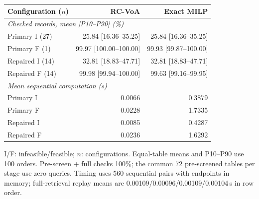 \caption{Matched interval and exact verification}\label{tab:exactverification}\centering
\footnotesize\setlength{\tabcolsep}{2pt}\renewcommand{\arraystretch}{1.0}
\begin{tabular*}{\linewidth}{@{\extracolsep{\fill}}lrr@{}}\toprule
Configuration ($n$)&RC-VoA&Exact MILP\\\midrule
\multicolumn{3}{l}{\textit{Checked records, mean [P10--P90] (\%)}}\\
Primary I (27)&25.84 [16.36--35.25]&25.84 [16.36--35.25]\\
Primary F (1)&99.97 [100.00--100.00]&99.93 [99.87--100.00]\\
Repaired I (14)&32.81 [18.83--47.71]&32.81 [18.83--47.71]\\
Repaired F (14)&99.98 [99.94--100.00]&99.63 [99.16--99.95]\\\midrule
\multicolumn{3}{l}{\textit{Mean sequential computation (s)}}\\
Primary I&0.0066&0.3879\\
Primary F&0.0228&1.7335\\
Repaired I&0.0085&0.4287\\
Repaired F&0.0236&1.6292\\\bottomrule
\end{tabular*}
\par\smallskip\parbox{\linewidth}{\footnotesize I/F: infeasible/feasible; $n$: configurations. Equal-table means and P10--P90 use 100 orders. Pre-screen + full checks 100\%; the common 72 pre-screened tables per stage use zero queries. Timing uses 560 sequential pairs with endpoints in memory; full-retrieval replay means are 0.00109/0.00096/0.00109/0.00104\,s in row order.}
